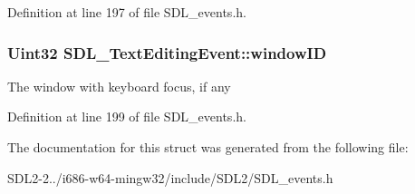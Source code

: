Definition at line 197 of file S\+D\+L\+\_\+events.\+h.

\hypertarget{structSDL__TextEditingEvent_a23b3e414cf7a7ccc547b7595ca930049}{
\subsubsection[{window\+I\+D}]{\setlength{\rightskip}{0pt plus 5cm}Uint32 S\+D\+L\+\_\+\+Text\+Editing\+Event\+::window\+I\+D}}\label{structSDL__TextEditingEvent_a23b3e414cf7a7ccc547b7595ca930049}
The window with keyboard focus, if any 

Definition at line 199 of file S\+D\+L\+\_\+events.\+h.



The documentation for this struct was generated from the following file\+:\begin{DoxyCompactItemize}
\item 
S\+D\+L2-\/2../i686-\/w64-\/mingw32/include/\+S\+D\+L2/S\+D\+L\+\_\+events.\+h\end{DoxyCompactItemize}
